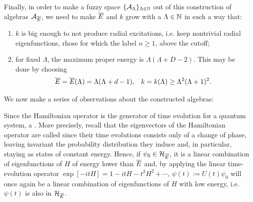 \lin 

Finally, in order to make a fuzzy space $\{\mathcal A_\Lambda\}_{\Lambda \in \mathbb{N}}$ out of this construction of algebras $\mathcal A_{\overline{E}}$, we need to make $\overline{E}$ and $k$ grow with a $\Lambda \in \mathbb{N}$ in such a way that:
\begin{enumerate}
    \item $k$ is big enough to not produce radial excitations, i.e. keep nontrivial radial eigenfunctions, rhose for which the label $n \geq 1$, above the cutoff;
    
    \item for fixed $\Lambda$, the maximum proper energy is $\Lambda(\Lambda + D - 2)$. This may be done by choosing 
\begin{align}
    \overline{E} = \overline{E}(\Lambda) &= \Lambda(\Lambda + d - 1), & k = k(\Lambda) \geq \Lambda^2(\Lambda + 1)^2.
\end{align}
\end{enumerate} 

\lin 

We now make a series of observations about the constructed algebras:

\begin{remark}
Since the Hamiltonian operator is the generator of time evolution for a quantum system, a . More precisely, recall that the eigenvectors of the Hamiltonian operator are called  since their time evolutions consists only of a change of phase, leaving invariant the probability distribution they induce and, in particular, staying as states of constant energy. 
Hence, if $\psi_0 \in \mathcal H_{\overline{E}}$, it is a linear combination of eigenfunctions of $H$ of energy lower than $\overline{E}$ and, by applying the linear time-evolution operator $\exp[-itH] = 1 - itH - t^2 H^2 + \cdots$, $\psi(t) := U(t) \psi_0$ will once again be a linear combination of eigenfunctions of $H$ with low energy, i.e. $\psi(t)$ is also in $\mathcal H_{\overline{E}}$.
\end{remark}

